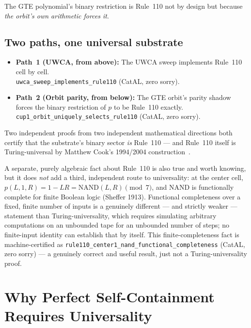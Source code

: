 \documentclass[11pt,a4paper]{article}
\newcommand{\lean}[1]{\texttt{#1}}
\begin{document}
The GTE polynomial's binary restriction is Rule~110 not by design but because
\emph{the orbit's own arithmetic forces it}.

\subsection{Two paths, one universal substrate}

\begin{tcolorbox}[colback=boxblue,colframe=blue!40!black,
  title=The two universality certificates]
\begin{itemize}
\item \textbf{Path~1 (UWCA, from above):} The UWCA sweep implements Rule~110 cell by cell.\\
  \lean{uwca\_sweep\_implements\_rule110} (CatAL, zero sorry).
\item \textbf{Path~2 (Orbit parity, from below):} The GTE orbit's parity shadow forces
  the binary restriction of $p$ to be Rule~110 exactly.\\
  \lean{cup1\_orbit\_uniquely\_selects\_rule110} (CatAL, zero sorry).
\end{itemize}
Two independent proofs from two independent mathematical directions both certify that
the substrate's binary sector \emph{is} Rule~110 --- and Rule~110 itself is
Turing-universal by Matthew Cook's 1994/2004 construction~\cite{Cook2004}.

A separate, purely algebraic fact about Rule~110 is also true and worth knowing,
but it does \emph{not} add a third, independent route to universality: at the
center cell, $p(L,1,R) = 1 - LR = \mathrm{NAND}(L,R) \pmod 7$, and NAND is
functionally complete for finite Boolean logic (Sheffer 1913).  Functional
completeness over a fixed, finite number of inputs is a genuinely different ---
and strictly weaker --- statement than Turing-universality, which requires
simulating arbitrary computations on an unbounded tape for an unbounded number
of steps; no finite-input identity can establish that by itself.  This
finite-completeness fact is machine-certified as
\lean{rule110\_center1\_nand\_functional\_completeness} (CatAL, zero sorry) ---
a genuinely correct and useful result, just not a Turing-universality proof.
\end{tcolorbox}

\section{Why Perfect Self-Containment Requires Universality}
\label{sec:psc-forces-universality}
\end{document}
